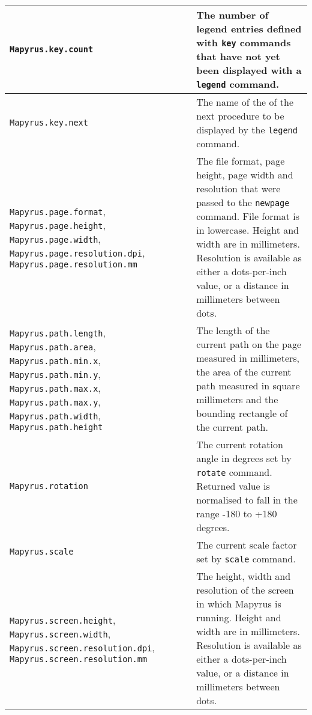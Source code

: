 \begin{longtable}{|p{6cm}|p{7cm}|}
\hline

\texttt{Mapyrus.key.count} &
The number of legend entries defined with
\texttt{key} commands that have not yet
been displayed with a
\texttt{legend} command. \\

\hline

\texttt{Mapyrus.key.next} &
The name of the of the next procedure to be displayed by the
\texttt{legend} command. \\

\hline

\texttt{Mapyrus.page.format},
\texttt{Mapyrus.page.height},
\texttt{Mapyrus.page.width},
\texttt{Mapyrus.page.resolution.dpi},
\texttt{Mapyrus.page.resolution.mm} &
The file format, page height, page width
and resolution that were passed to the
\texttt{newpage} command.  File format is in lowercase.
Height and width are in millimeters.  Resolution is available
as either a dots-per-inch value, or a distance in millimeters between
dots. \\

\hline

\texttt{Mapyrus.path.length},
\texttt{Mapyrus.path.area},
\texttt{Mapyrus.path.min.x},
\texttt{Mapyrus.path.min.y},
\texttt{Mapyrus.path.max.x},
\texttt{Mapyrus.path.max.y},
\texttt{Mapyrus.path.width},
\texttt{Mapyrus.path.height} &
The length of the current path on the page measured in millimeters,
the area of the current path measured in square millimeters
and the bounding rectangle of the current path. \\

\hline

\texttt{Mapyrus.rotation} &
The current rotation angle in degrees set by
\texttt{rotate} command.
Returned value is normalised to fall in the
range -180 to +180 degrees. \\

\hline

\texttt{Mapyrus.scale} &
The current scale factor set by \texttt{scale} command. \\

\hline

\texttt{Mapyrus.screen.height},
\texttt{Mapyrus.screen.width},
\texttt{Mapyrus.screen.resolution.dpi},
\texttt{Mapyrus.screen.resolution.mm} &
The height, width and resolution of the screen in which Mapyrus
is running.
Height and width are in millimeters.  Resolution is available
as either a dots-per-inch value, or a distance in millimeters between
dots. \\


\end{longtable}
